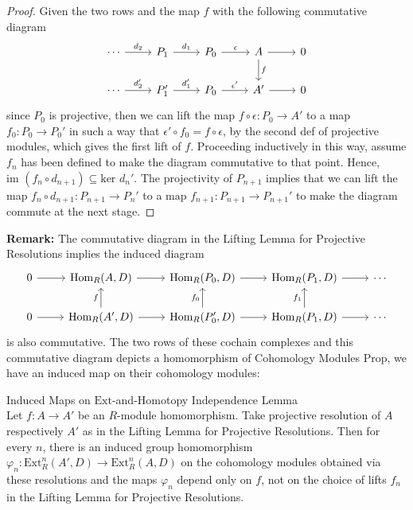 \begin{proof}
    Given the two rows and the map $f$ with the following commutative diagram
    \[
    \begin{tikzcd}
        \cdots \arrow[r, "d_2"] &P_1 \arrow[r, "d_1"] &P_0 \arrow[r, "\epsilon"] &A \arrow[r] \arrow[d, "f"] &0\\
        \cdots \arrow[r, "d_2'"] &P_1' \arrow[r, "d_1'"] &P_0 \arrow[r, "\epsilon'"] &A' \arrow[r] &0
    \end{tikzcd}
    \]
    since $P_0$ is projective, then we can lift the map $f \circ \epsilon: P_0 \to A'$ to a map $f_0: P_0 \to P_0'$ in such a way that $\epsilon' \circ f_0=f \circ \epsilon$, by the second def of projective modules, which gives the first lift of $f$. Proceeding inductively in this way, assume $f_n$ has been defined to make the diagram commutative to that point. Hence, $\text{im } (f_n \circ d_{n+1}) \subseteq \text{ker }d_n'$. The projectivity of $P_{n+1}$ implies that we can lift the map $f_n \circ d_{n+1}: P_{n+1} \to P_n'$ to a map $f_{n+1} :P_{n+1} \to P_{n+1}'$ to make the diagram commute at the next stage.
\end{proof}


\noindent\textbf{Remark:} The commutative diagram in the Lifting Lemma for Projective Resolutions implies the induced diagram
\[
\begin{tikzcd}
    0 \arrow[r] & \text{Hom}_R(A,D) \arrow[r] & \text{Hom}_R(P_0,D) \arrow[r] &\text{Hom}_R (P_1,D) \arrow[r] &\cdots\\
    0 \arrow[r] &\text{Hom}_R(A',D) \arrow[r] \arrow[u, "f"] &\text{Hom}_R(P_0',D) \arrow[r] \arrow[u, "f_0"]& \text{Hom}_R(P_1,D) \arrow[r] \arrow[u, "f_1"] &\cdots
\end{tikzcd}
\]
is also commutative. The two rows of these cochain complexes and this commutative diagram depicts a homomorphism of Cohomology Modules Prop, we have an induced map on their cohomology modules:

\begin{lemma}{Induced Maps on $\text{Ext}$-and-Homotopy Independence Lemma}\\
Let $f:A\to A'$ be an $R$-module homomorphism. Take projective resolution of $A$ respectively $A'$ as in the Lifting Lemma for Projective Resolutions. Then for every $n$, there is an induced group homomorphism $\varphi_n: \text{Ext}_R^n (A',D) \to \text{Ext}_R^n (A,D)$ on the cohomology modules obtained via these resolutions and the maps $\varphi_n$ depend only on $f$, not on the choice of lifts $f_n$ in the Lifting Lemma for Projective Resolutions.
\end{lemma}

